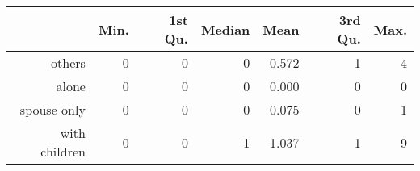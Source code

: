 \documentclass[11pt]{article}
\begin{document}
\begin{table}[ht]
\centering
\begin{tabular}{rrrrrrr}
  \hline
 & Min. & 1st Qu. & Median & Mean & 3rd Qu. & Max. \\ 
  \hline
others & 0 & 0 & 0 & 0.572 & 1 & 4 \\ 
  alone & 0 & 0 & 0 & 0.000 & 0 & 0 \\ 
  spouse only & 0 & 0 & 0 & 0.075 & 0 & 1 \\ 
  with children & 0 & 0 & 1 & 1.037 & 1 & 9 \\ 
   \hline
\end{tabular}
\end{table}
\end{document}
